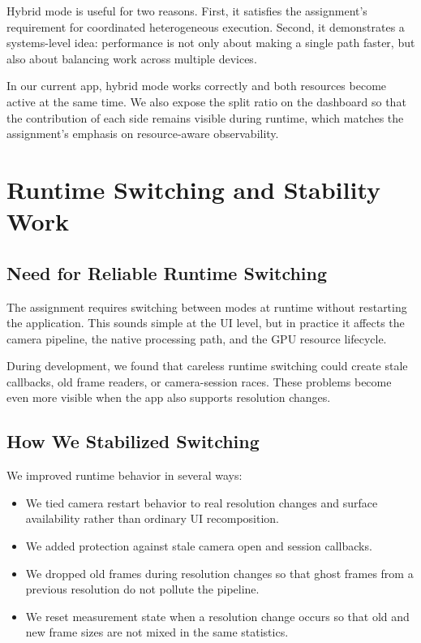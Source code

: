 \documentclass[12pt,a4paper]{article}
\begin{document}
Hybrid mode is useful for two reasons. First, it satisfies the assignment's requirement for coordinated heterogeneous execution. Second, it demonstrates a systems-level idea: performance is not only about making a single path faster, but also about balancing work across multiple devices.

In our current app, hybrid mode works correctly and both resources become active at the same time. We also expose the split ratio on the dashboard so that the contribution of each side remains visible during runtime, which matches the assignment's emphasis on resource-aware observability.

\section{Runtime Switching and Stability Work}

\subsection{Need for Reliable Runtime Switching}

The assignment requires switching between modes at runtime without restarting the application. This sounds simple at the UI level, but in practice it affects the camera pipeline, the native processing path, and the GPU resource lifecycle.

During development, we found that careless runtime switching could create stale callbacks, old frame readers, or camera-session races. These problems become even more visible when the app also supports resolution changes.

\subsection{How We Stabilized Switching}

We improved runtime behavior in several ways:

\begin{itemize}
\item We tied camera restart behavior to real resolution changes and surface availability rather than ordinary UI recomposition.
\item We added protection against stale camera open and session callbacks.
\item We dropped old frames during resolution changes so that ghost frames from a previous resolution do not pollute the pipeline.
\item We reset measurement state when a resolution change occurs so that old and new frame sizes are not mixed in the same statistics.
\end{itemize}
\end{document}
